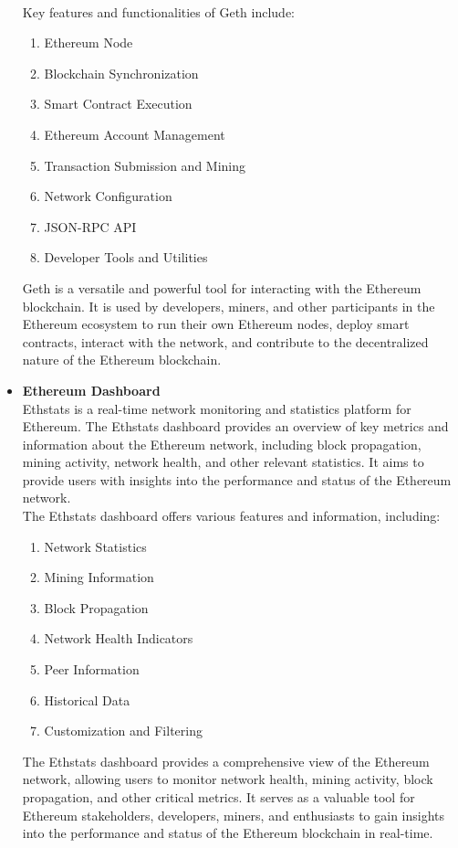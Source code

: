 \documentclass[oneside, 12pt]{book}
\begin{document}
\begin{itemize}
					\\Key features and functionalities of Geth include:
					\begin{enumerate}
						\item Ethereum Node
						\item Blockchain Synchronization
						\item Smart Contract Execution
						\item Ethereum Account Management
						\item Transaction Submission and Mining
						\item Network Configuration
						\item JSON-RPC API
						\item Developer Tools and Utilities
					\end{enumerate}
					Geth is a versatile and powerful tool for interacting with the Ethereum blockchain. It is used by developers, miners, and other participants in the Ethereum ecosystem to run their own Ethereum nodes, deploy smart contracts, interact with the network, and contribute to the decentralized nature of the Ethereum blockchain.
				\item\textbf{Ethereum Dashboard}
					\\Ethstats is a real-time network monitoring and statistics platform for Ethereum. The Ethstats dashboard provides an overview of key metrics and information about the Ethereum network, including block propagation, mining activity, network health, and other relevant statistics. It aims to provide users with insights into the performance and status of the Ethereum network.
					\\The Ethstats dashboard offers various features and information, including:
					\begin{enumerate}
						\item Network Statistics
						\item Mining Information
						\item Block Propagation
						\item Network Health Indicators
						\item Peer Information
						\item Historical Data
						\item Customization and Filtering
					\end{enumerate}
					The Ethstats dashboard provides a comprehensive view of the Ethereum network, allowing users to monitor network health, mining activity, block propagation, and other critical metrics. It serves as a valuable tool for Ethereum stakeholders, developers, miners, and enthusiasts to gain insights into the performance and status of the Ethereum blockchain in real-time.
			\end{itemize}
\end{document}
